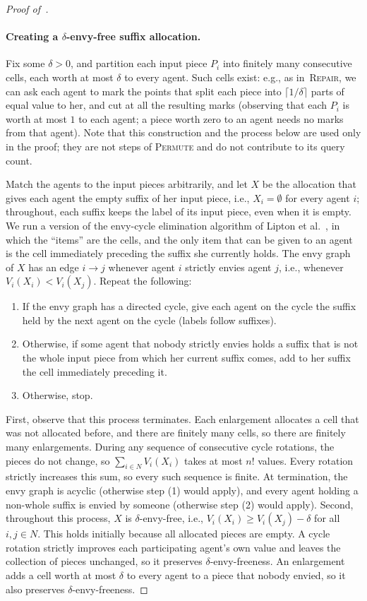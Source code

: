 \documentclass[11pt]{article}
\newcommand{\Repair}{\textsc{Repair}}
\newcommand{\Permute}{\textsc{Permute}}
\theoremstyle{plain}
\theoremstyle{definition}
\theoremstyle{plain}
\begin{document}
\begin{proof}[Proof of~]
 

\paragraph{Creating a $\delta$-envy-free suffix allocation.}
Fix some $\delta>0$, and partition each input piece $P_i$ into finitely many consecutive cells, each worth at most $\delta$ to every agent. Such cells exist: e.g., as in~\Repair{}, we can ask each agent to mark the points that split each piece into $\lceil1/\delta\rceil$ parts of equal value to her, and cut at all the resulting marks (observing that each $P_i$ is worth at most $1$ to each agent; a piece worth zero to an agent needs no marks from that agent). Note that this construction and the process below are used only in the proof; they are not steps of \Permute{} and do not contribute to its query count.

Match the agents to the input pieces arbitrarily, and let $X$ be the allocation that gives each agent the empty suffix of her input piece, i.e., $X_i=\emptyset$ for every agent $i$; throughout, each suffix keeps the label of its input piece, even when it is empty. We run a version of the envy-cycle elimination algorithm of Lipton et al.~\cite{lipton2004approximately}, in which the ``items'' are the cells, and the only item that can be given to an agent is the cell immediately preceding the suffix she currently holds. The envy graph of $X$ has an edge $i\to j$ whenever agent $i$ strictly envies agent $j$, i.e., whenever $V_i(X_i)<V_i(X_j)$. Repeat the following:
\begin{enumerate}[leftmargin=*]
\item If the envy graph has a directed cycle, give each agent on the cycle the suffix held by the next agent on the cycle (labels follow suffixes).
\item Otherwise, if some agent that nobody strictly envies holds a suffix that is not the whole input piece from which her current suffix comes, add to her suffix the cell immediately preceding it.
\item Otherwise, stop.
\end{enumerate}

First, observe that this process terminates. Each enlargement allocates a cell that was not allocated before, and there are finitely many cells, so there are finitely many enlargements. During any sequence of consecutive cycle rotations, the pieces do not change, so $\sum_{i\in N}V_i(X_i)$ takes at most $n!$ values. Every rotation strictly increases this sum, so every such sequence is finite. At termination, the envy graph is acyclic (otherwise step (1) would apply), and every agent holding a non-whole suffix is envied by someone (otherwise step (2) would apply).
Second, throughout this process, $X$ is $\delta$-envy-free, i.e., $V_i(X_i)\ge V_i(X_j)-\delta$ for all $i, j \in N$. This holds initially because all allocated pieces are empty. A cycle rotation strictly improves each participating agent's own value and leaves the collection of pieces unchanged, so it preserves $\delta$-envy-freeness. An enlargement adds a cell worth at most $\delta$ to every agent to a piece that nobody envied, so it also preserves $\delta$-envy-freeness.


\end{proof}
\end{document}

